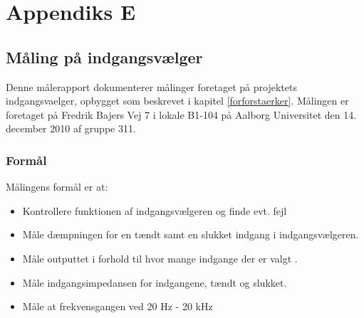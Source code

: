 %
%
\chapter{Appendiks E}
\label{maalejournal_indgangsvaelger}
\section*{Måling på indgangsvælger}
Denne målerapport dokumenterer målinger foretaget på projektets indgangsvaelger, opbygget som beskrevet i kapitel \ref{forforstaerker}. Målingen er foretaget på Fredrik Bajers Vej 7 i lokale B1-104 på Aalborg Universitet den 14. december 2010 af gruppe 311.

\subsection*{Formål}
\label{maalejournal_formaal}
Målingens formål er at:
\begin{itemize}
\item Kontrollere funktionen af indgangsvælgeren og finde evt. fejl
\item Måle dæmpningen for en tændt samt en slukket indgang i indgangsvælgeren.
\item Måle outputtet i forhold til hvor mange indgange der er valgt .
\item Måle indgangsimpedansen for indgangene, tændt og slukket.
\item Måle at frekvensgangen ved 20 Hz - 20 kHz 
\end{itemize}


